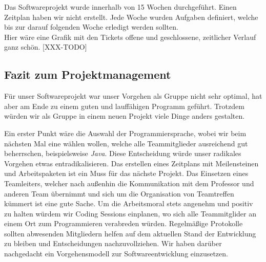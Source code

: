 Das Softwareprojekt wurde innerhalb von 15 Wochen durchgeführt. Einen Zeitplan haben wir nicht erstellt. Jede Woche wurden Aufgaben definiert, welche bis zur darauf folgenden Woche erledigt werden sollten.\\

Hier wäre eine Grafik mit den Tickets offene und geschlossene, zeitlicher Verlauf ganz schön. [XXX-TODO]


\subsection{Fazit zum Projektmanagement}
\label{subsec:fazitPM}

Für unser Softwareprojekt war unser Vorgehen als Gruppe nicht sehr optimal, hat aber am Ende zu einem guten und lauffähigen Programm geführt. Trotzdem würden wir als Gruppe in einem neuen Projekt viele Dinge anders gestalten.

Ein erster Punkt wäre die Auswahl der Programmiersprache, wobei wir beim nächsten Mal eine wählen wollen, welche alle Teammitglieder ausreichend gut beherrschen, beispielsweise \emph{Java}. Diese Entscheidung würde unser radikales Vorgehen etwas entradikalisieren. Das erstellen eines Zeitplans mit Meilensteinen und Arbeitspaketen ist ein Muss für das nächste Projekt.
Das Einsetzen eines Teamleiters, welcher nach außenhin die Kommunikation mit dem Professor und anderen Team übernimmt und sich um die Organisation von Teamtreffen kümmert ist eine gute Sache. Um die Arbeitsmoral stets angenehm und positiv zu halten würdem wir Coding Sessions einplanen, wo sich alle Teammitglider an einem Ort zum Programmieren verabreden würden. Regelmäßige Protokolle sollten abwesenden Mitgliedern helfen auf dem aktuellen Stand der Entwicklung zu bleiben und Entscheidungen nachzuvollziehen.
Wir haben darüber nachgedacht ein Vorgehensmodell zur Softwareentwicklung einzusetzen.